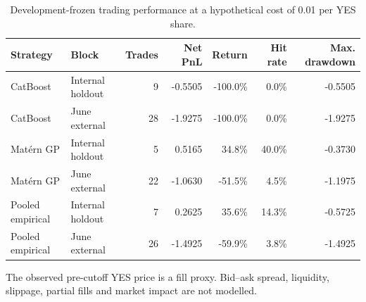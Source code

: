 \begin{table}[htbp]
\centering
\caption{Development-frozen trading performance at a hypothetical cost of 0.01 per YES share.}
\label{tab:trading_evaluation}
\begin{tabular}{llrrrrr}
\toprule
Strategy & Block & Trades & Net PnL & Return & Hit rate & Max. drawdown \\
\midrule
CatBoost & Internal holdout & 9 & -0.5505 & -100.0\% & 0.0\% & -0.5505 \\
CatBoost & June external & 28 & -1.9275 & -100.0\% & 0.0\% & -1.9275 \\
Matérn GP & Internal holdout & 5 & 0.5165 & 34.8\% & 40.0\% & -0.3730 \\
Matérn GP & June external & 22 & -1.0630 & -51.5\% & 4.5\% & -1.1975 \\
Pooled empirical & Internal holdout & 7 & 0.2625 & 35.6\% & 14.3\% & -0.5725 \\
Pooled empirical & June external & 26 & -1.4925 & -59.9\% & 3.8\% & -1.4925 \\
\bottomrule
\end{tabular}
\begin{minipage}{0.94\textwidth}
\footnotesize The observed pre-cutoff YES price is a fill proxy. Bid--ask spread, liquidity, slippage, partial fills and market impact are not modelled.
\end{minipage}
\end{table}
